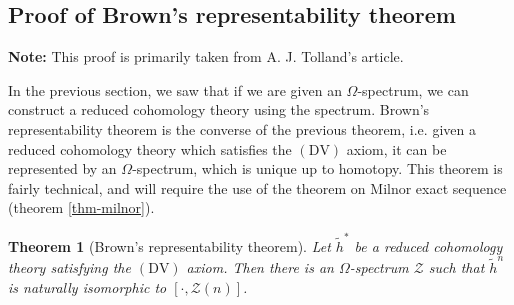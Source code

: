 \documentclass[12pt, notitlepage]{article}
\newtheorem{thm}{Theorem}[section]
\theoremstyle{definition}
\newcommand{\calz}{\mathcal{Z}}
\newcommand{\redco}{\widetilde{h}}
\newcommand{\dv}{\mathrm{DV}}
\begin{document}

\subsection{Proof of Brown's representability theorem}
\label{sec:proof-browns-repr}

\textbf{Note:} This proof is primarily taken from A. J. Tolland's article\cite{tolland}.

In the previous section, we saw that if we are given an $\Omega$-spectrum, we can construct a
reduced cohomology theory using the spectrum. Brown's representability theorem is the converse of
the previous theorem, i.e. given a reduced cohomology theory which satisfies the $(\dv)$ axiom, it
can be represented by an $\Omega$-spectrum, which is unique up to homotopy. This theorem is fairly
technical, and will require the use of the theorem on Milnor exact sequence (theorem
\ref{thm-milnor}).

\begin{thm}[Brown's representability theorem]
  Let $\redco^{\ast}$ be a reduced cohomology theory satisfying the $(\dv)$ axiom. Then there is an
  $\Omega$-spectrum $\calz$ such that $\redco^{n}$ is naturally isomorphic to
  $\left[\cdot, \calz(n) \right]$.
\end{thm}
\end{document}
